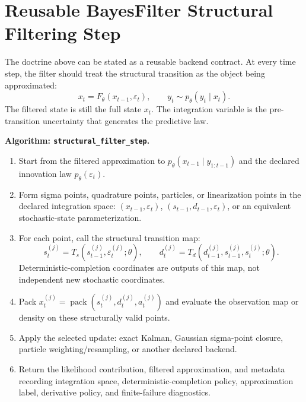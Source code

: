 \section{Reusable BayesFilter Structural Filtering Step}
\label{sec:bf-structural-filter-step-algorithm}

The doctrine above can be stated as a reusable backend contract.  At every time
step, the filter should treat the structural transition as the object being
approximated:
\[
  x_t = F_\theta(x_{t-1},\varepsilon_t),
  \qquad
  y_t \sim p_\theta(y_t\mid x_t).
\]
The filtered state is still the full state $x_t$.  The integration variable is
the pre-transition uncertainty that generates the predictive law.

\begin{mdframed}
\textbf{Algorithm: \texttt{structural\_filter\_step}.}

\begin{enumerate}[label=(\arabic*)]
  \item Start from the filtered approximation to
    $p_\theta(x_{t-1}\mid y_{1:t-1})$ and the declared innovation law
    $p_\theta(\varepsilon_t)$.
  \item Form sigma points, quadrature points, particles, or linearization
    points in the declared integration space:
    $(x_{t-1},\varepsilon_t)$, $(s_{t-1},d_{t-1},\varepsilon_t)$, or an
    equivalent stochastic-state parameterization.
  \item For each point, call the structural transition map:
    \begin{equation}
      s_t^{(j)}=T_s(s_{t-1}^{(j)},\varepsilon_t^{(j)};\theta),
      \qquad
      d_t^{(j)}=T_d(d_{t-1}^{(j)},s_{t-1}^{(j)},s_t^{(j)};\theta).
    \end{equation}
    Deterministic-completion coordinates are outputs of this map, not
    independent new stochastic coordinates.
  \item Pack $x_t^{(j)}=\operatorname{pack}(s_t^{(j)},d_t^{(j)},a_t^{(j)})$
    and evaluate the observation map or density on these structurally valid
    points.
  \item Apply the selected update: exact Kalman, Gaussian sigma-point closure,
    particle weighting/resampling, or another declared backend.
  \item Return the likelihood contribution, filtered approximation, and
    metadata recording integration space, deterministic-completion policy,
    approximation label, derivative policy, and finite-failure diagnostics.
\end{enumerate}
\end{mdframed}

